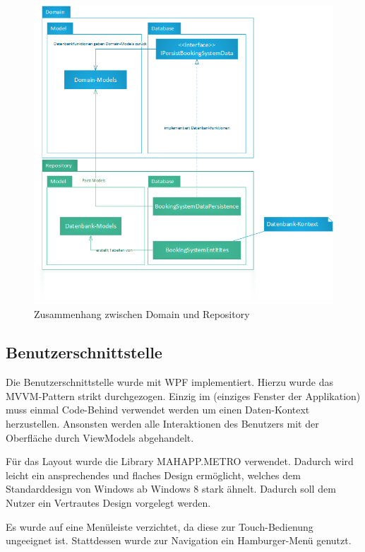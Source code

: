 \begin{figure}[h]
	\begin{center}
		\includegraphics[width=\columnwidth]{Implementierung/Model-Datenbank.png}
	\end{center}
	\caption{Zusammenhang zwischen Domain und Repository}
	\label{fig:model-database}
\end{figure}

\subsection{Benutzerschnittstelle}
Die Benutzerschnittstelle wurde mit WPF implementiert. Hierzu wurde das MVVM-Pattern strikt durchgezogen. Einzig im  (einziges Fenster der Applikation) muss einmal Code-Behind verwendet werden um einen Daten-Kontext herzustellen. Ansonsten werden alle Interaktionen des Benutzers mit der Oberfläche durch ViewModels abgehandelt. 

Für das Layout wurde die Library MAHAPP.METRO verwendet. Dadurch wird leicht ein ansprechendes und flaches Design ermöglicht, welches dem Standarddesign von Windows ab Windows 8 stark ähnelt. Dadurch soll dem Nutzer ein Vertrautes Design vorgelegt werden.

Es wurde auf eine Menüleiste verzichtet, da diese zur Touch-Bedienung ungeeignet ist. Stattdessen wurde zur Navigation ein Hamburger-Menü genutzt.

